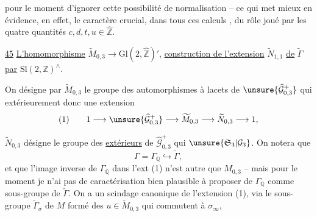 
pour le moment d'ignorer cette possibilité de normalisation -- ce qui met mieux en évidence, en effet, le caractère crucial, dans tous ces calculs , du rôle joué par les quatre quantités $c,d,t,u\in\widehat{\mathbb Z}$.


\uline{45} \uline{L'homomorphisme} $\widetilde M_{0,3}\longrightarrow\mathrm{Gl}(2,\widehat{\mathbb Z})'$, \uline{construction de l'extension} $\widetilde N_{1,1}$ \uline{de} $\widetilde\Gamma$ \uline{par} $\mathrm{Sl}(2,\mathbb Z)^\wedge$.

On désigne par $\widetilde M_{0,3}$ le groupe des automorphismes  à lacets de $\unsure{\widehat{\mathcal G}_{0,3}^{+}}$ qui   extérieurement   donc une  extension
\[
(1)\qquad 1\longrightarrow\unsure{\widehat{\mathcal G}_{0,3}^{+}}\longrightarrow\widetilde M_{0,3}\longrightarrow\widetilde N_{0,3}\longrightarrow 1,
\]

$\widetilde N_{0,3}$ désigne le groupe des  \uline{extérieurs} de $\widehat{\mathcal G}_{0,3}^{+}$ qui   $\unsure{\mathfrak S_3|\mathcal G_3}$. On notera que
\[
\Gamma=\Gamma_{\mathbb Q}\hookrightarrow\widetilde\Gamma,
\]
et que l'image inverse de $\Gamma_{\mathbb Q}$ dans l'ext (1) n'est autre que $M_{0,3}$ -- mais pour le moment je n'ai pas de caractérisation bien plausible à proposer de $\Gamma_{\mathbb Q}$ comme sous-groupe de $\widetilde\Gamma$. On a un scindage canonique de l'extension (1), via le sous-groupe $\widetilde\Gamma_{\sigma}$ de $M$ formé des  $u\in\widetilde M_{0,3}$ qui commutent à $\sigma_\infty$,



